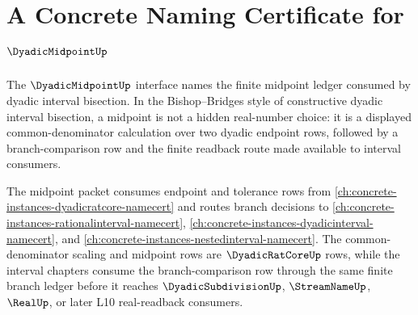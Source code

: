 \chapter{A Concrete Naming Certificate for $\DyadicMidpointUp$}
\label{ch:concrete-instances-dyadicmidpoint-namecert}

The $\DyadicMidpointUp$ interface names the finite midpoint ledger consumed by dyadic interval bisection. In the Bishop--Bridges style of constructive dyadic interval bisection, a midpoint is not a hidden real-number choice: it is a displayed common-denominator calculation over two dyadic endpoint rows, followed by a branch-comparison row and the finite readback route made available to interval consumers.

The midpoint packet consumes endpoint and tolerance rows from \autoref{ch:concrete-instances-dyadicratcore-namecert} and routes branch decisions to \autoref{ch:concrete-instances-rationalinterval-namecert}, \autoref{ch:concrete-instances-dyadicinterval-namecert}, and \autoref{ch:concrete-instances-nestedinterval-namecert}. The common-denominator scaling and midpoint rows are $\DyadicRatCoreUp$ rows, while the interval chapters consume the branch-comparison row through the same finite branch ledger before it reaches $\DyadicSubdivisionUp$, $\StreamNameUp$, $\RealUp$, or later L10 real-readback consumers.

